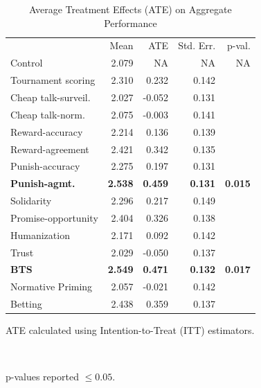 \documentclass{cscw2010}
\begin{document}
\begin{table}[ht]					%
\begin{center}						%
\caption{Average Treatment Effects (ATE) on Aggregate Performance} %
\vspace{8pt}
\begin{threeparttable}
\begin{tabular}{@{}l r r r r@{}}
\toprule
& Mean & ATE\tnote{\dag} & Std. Err. & p-val.\tnote{\ddag}\\
\cmidrule(l){2-5}
Control & 2.079 & NA & NA & NA\\
Tournament scoring & 2.310 & 0.232 & 0.142 &\\
Cheap talk-surveil.& 2.027 & -0.052 & 0.131 &\\
Cheap talk-norm.& 2.075 & -0.003 & 0.141 &\\
Reward-accuracy& 2.214 & 0.136 & 0.139 &\\
Reward-agreement& 2.421 & 0.342 & 0.135 &\\
Punish-accuracy& 2.275 & 0.197 & 0.131 & \\
\textbf{Punish-agmt.} & \textbf{2.538} & \textbf{0.459} & \textbf{0.131} & \textbf{0.015}\\
Solidarity& 2.296 & 0.217 & 0.149 &\\
Promise-opportunity& 2.404 & 0.326 & 0.138 &\\
Humanization& 2.171 & 0.092 & 0.142 &\\
Trust& 2.029 & -0.050 & 0.137 &\\
\textbf{BTS} & \textbf{2.549} & \textbf{0.471} & \textbf{0.132} & \textbf{0.017}\\
Normative Priming& 2.057 & -0.021 & 0.142 &\\
Betting& 2.438 & 0.359 & 0.137 &\\ 
  \bottomrule
\end{tabular}
  \begin{tablenotes}[para]
     \small{\item[\dag]ATE calculated using Intention-to-Treat (ITT) estimators.}\\
     \item[\ddag]p-values reported $\leq 0.05$.
  \end{tablenotes}
\end{threeparttable}
\label{table:agg_results_ITT}
\end{center}
\end{table}
\end{document}
